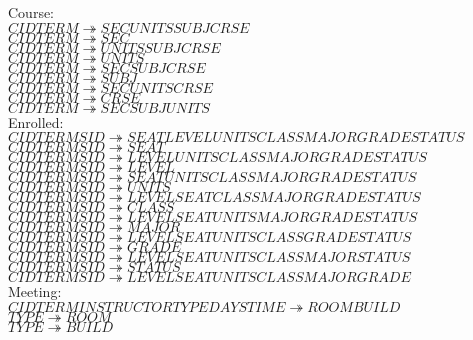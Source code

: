 Course: \\
$CID TERM \twoheadrightarrow SEC UNITS SUBJ CRSE$ \\
$CID TERM \twoheadrightarrow SEC$ \\
$CID TERM \twoheadrightarrow UNITS SUBJ CRSE$ \\
$CID TERM \twoheadrightarrow UNITS$ \\
$CID TERM \twoheadrightarrow SEC SUBJ CRSE$\\
$CID TERM \twoheadrightarrow SUBJ$ \\
$CID TERM \twoheadrightarrow SEC UNITS CRSE$ \\
$CID TERM \twoheadrightarrow CRSE$ \\
$CID TERM \twoheadrightarrow SEC SUBJ UNITS$ \\

Enrolled: \\

$CID TERM SID \twoheadrightarrow SEAT LEVEL UNITS CLASS MAJOR GRADE STATUS$ \\
$CID TERM SID \twoheadrightarrow SEAT$ \\
$CID TERM SID \twoheadrightarrow LEVEL UNITS CLASS MAJOR GRADE STATUS$\\
$CID TERM SID \twoheadrightarrow LEVEL$ \\
$CID TERM SID \twoheadrightarrow SEAT UNITS CLASS MAJOR GRADE STATUS$\\
$CID TERM SID \twoheadrightarrow UNITS$\\
$CID TERM SID \twoheadrightarrow LEVEL SEAT CLASS MAJOR GRADE STATUS$ \\
$CID TERM SID \twoheadrightarrow CLASS$\\
$CID TERM SID \twoheadrightarrow LEVEL SEAT UNITS MAJOR GRADE STATUS$ \\
$CID TERM SID \twoheadrightarrow MAJOR$\\
$CID TERM SID \twoheadrightarrow LEVEL SEAT UNITS CLASS GRADE STATUS$\\
$CID TERM SID \twoheadrightarrow GRADE$\\
$CID TERM SID \twoheadrightarrow LEVEL SEAT UNITS CLASS MAJOR STATUS$ \\
$CID TERM SID \twoheadrightarrow STATUS$\\
$CID TERM SID \twoheadrightarrow LEVEL SEAT UNITS CLASS MAJOR GRADE$ \\

Meeting: \\
$CID TERM INSTRUCTOR TYPE DAYS TIME \twoheadrightarrow ROOM BUILD$ \\
$TYPE \twoheadrightarrow ROOM$ \\
$TYPE \twoheadrightarrow BUILD$ \\